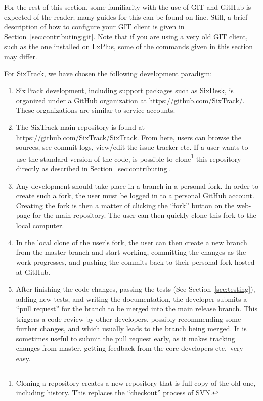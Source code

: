 \documentclass[english,BCOR=0mm,DIV=18]{scrartcl}
\begin{document}
For the rest of this section, some familiarity with the use of GIT and GitHub is expected of the reader; many guides for this can be found on-line.
Still, a brief description of how to configure your GIT client is given in Section~\ref{sec:contributing:git}.
Note that if you are using a very old GIT client, such as the one installed on LxPlus, some of the commands given in this section may differ.

For SixTrack, we have chosen the following development paradigm:
\begin{enumerate}
\item SixTrack development, including support packages such as SixDesk, is organized under a GitHub organization at \url{https://github.com/SixTrack/}.
      These organizations are similar to service accounts.
\item The SixTrack main repository is found at \url{https://github.com/SixTrack/SixTrack}.
      From here, users can browse the sources, see commit logs, view/edit the issue tracker etc.
      If a user wants to use the standard version of the code, is possible to clone\footnote{Cloning a repository creates a new repository that is full copy of the old one, including history. This replaces the ``checkout'' process of SVN.} this repository directly as described in Section~\ref{sec:contributing}.
\item Any development should take place in a branch in a personal fork.
      In order to create such a fork, the user must be logged in to a personal GitHub account.
      Creating the fork is then a matter of clicking the ``fork'' button on the web-page for the main repository.
      The user can then quickly clone this fork to the local computer.
\item In the local clone of the user's fork, the user can then create a new branch from the master branch and start working, committing the changes as the work progresses, and pushing the commits back to their personal fork hosted at GitHub.
\item After finishing the code changes, passing the tests (See Section~\ref{sec:testing}), adding new tests, and writing the documentation, the developer submits a ``pull request'' for the branch to be merged into the main release branch.
      This triggers a code review by other developers, possibly recommending some further changes, and which usually leads to the branch being merged.
      It is sometimes useful to submit the pull request early, as it makes tracking changes from master, getting feedback from the core developers etc.\ very easy.

\end{enumerate}
\end{document}
